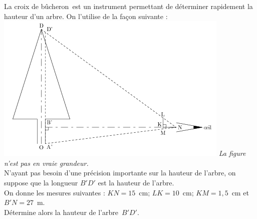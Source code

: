 
\og La croix de bûcheron\fg\ est un instrument permettant de
déterminer rapidement la hauteur d'un arbre. On l'utilise de la façon
suivante :
\includegraphics[scale=1]{TR-exo13.png} 
{\em La figure n'est pas en vraie grandeur.}\\
N'ayant pas besoin d'une précision importante sur la hauteur de
l'arbre, on suppose que la longueur $B'D'$ est la hauteur de l'arbre.
\\On donne les mesures suivantes : $KN=15$~cm; $LK=10$~cm; $KM=1,5$~cm
et $B'N=27$~m.
\\Détermine alors \og la hauteur de l'arbre\fg\ $B'D'$.
 